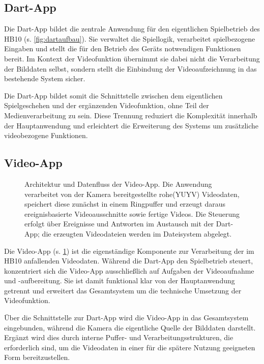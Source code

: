 \subsection{Dart-App}

Die Dart-App bildet die zentrale Anwendung für den eigentlichen Spielbetrieb des HB10 (s. \cref{fig:dartaufbau}). Sie verwaltet die Spiellogik, verarbeitet spielbezogene Eingaben und stellt die für den Betrieb des Geräts notwendigen Funktionen bereit. 
Im Kontext der Videofunktion übernimmt sie dabei nicht die Verarbeitung der Bilddaten selbst, sondern stellt die Einbindung der Videoaufzeichnung in das bestehende System sicher.

Die Dart-App bildet somit die Schnittstelle zwischen dem eigentlichen Spielgeschehen und der ergänzenden Videofunktion, ohne Teil der Medienverarbeitung zu sein. 
Diese Trennung reduziert die Komplexität innerhalb der Hauptanwendung und erleichtert die Erweiterung des Systems um zusätzliche videobezogene Funktionen.

\subsection{Video-App}

\begin{figure}[h]
    \centering
    
    \caption[Architektur und Datenfluss der Video-App]{Architektur und Datenfluss der Video-App. Die Anwendung verarbeitet von der Kamera bereitgestellte rohe(YUYV\cite{theKernel2020YUYV}) Videodaten, speichert diese zunächst in einem Ringpuffer und erzeugt daraus ereignisbasierte Videoausschnitte sowie fertige Videos. 
    Die Steuerung erfolgt über Ereignisse und Antworten im Austausch mit der Dart-App; die erzeugten Videodateien werden im Dateisystem abgelegt.}
    \label{fig:videoapp}
\end{figure}

Die Video-App (s. \cref{fig:videoapp}) ist die eigenständige Komponente zur Verarbeitung der im HB10 anfallenden Videodaten. Während die Dart-App den Spielbetrieb steuert, konzentriert sich die Video-App ausschließlich auf Aufgaben der Videoaufnahme und \mbox{-aufbereitung}. 
Sie ist damit funktional klar von der Hauptanwendung getrennt und erweitert das Gesamtsystem um die technische Umsetzung der Videofunktion.

Über die Schnittstelle zur Dart-App wird die Video-App in das Gesamtsystem eingebunden, während die Kamera die eigentliche Quelle der Bilddaten darstellt. Ergänzt wird dies durch interne Puffer- und Verarbeitungsstrukturen, die erforderlich sind, 
um die Videodaten in einer für die spätere Nutzung geeigneten Form bereitzustellen.

